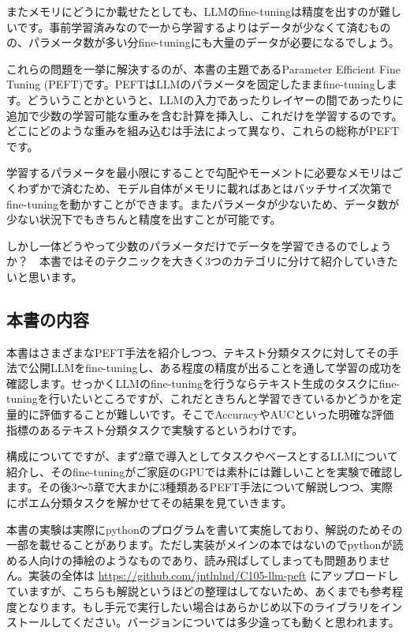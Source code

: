 \documentclass[a5paper,twoside,dvipdfmx]{jsarticle}
\begin{document}
またメモリにどうにか載せたとしても、LLMのfine-tuningは精度を出すのが難しいです。事前学習済みなので一から学習するよりはデータが少なくて済むものの、パラメータ数が多い分fine-tuningにも大量のデータが必要になるでしょう。

これらの問題を一挙に解決するのが、本書の主題であるParameter Efficient Fine Tuning (\textsf{PEFT})です。PEFTはLLMのパラメータを固定したままfine-tuningします。どういうことかというと、LLMの入力であったりレイヤーの間であったりに追加で少数の学習可能な重みを含む計算を挿入し、これだけを学習するのです。どこにどのような重みを組み込むは手法によって異なり、これらの総称がPEFTです。

学習するパラメータを最小限にすることで勾配やモーメントに必要なメモリはごくわずかで済むため、モデル自体がメモリに載ればあとはバッチサイズ次第でfine-tuningを動かすことができます。またパラメータが少ないため、データ数が少ない状況下でもきちんと精度を出すことが可能です。

しかし一体どうやって少数のパラメータだけでデータを学習できるのでしょうか？　本書ではそのテクニックを大きく3つのカテゴリに分けて紹介していきたいと思います。

\subsection{本書の内容}

本書はさまざまなPEFT手法を紹介しつつ、テキスト分類タスクに対してその手法で公開LLMをfine-tuningし、ある程度の精度が出ることを通して学習の成功を確認します。せっかくLLMのfine-tuningを行うならテキスト生成のタスクにfine-tuningを行いたいところですが、これだときちんと学習できているかどうかを定量的に評価することが難しいです。そこでAccuracyやAUCといった明確な評価指標のあるテキスト分類タスクで実験するというわけです。

構成についてですが、まず2章で導入としてタスクやベースとするLLMについて紹介し、そのfine-tuningがご家庭のGPUでは素朴には難しいことを実験で確認します。その後3～5章で大まかに3種類あるPEFT手法について解説しつつ、実際にポエム分類タスクを解かせてその結果を見ていきます。

本書の実験は実際にpythonのプログラムを書いて実施しており、解説のためその一部を載せることがあります。ただし実装がメインの本ではないのでpythonが読める人向けの挿絵のようなものであり、読み飛ばしてしまっても問題ありません。実装の全体は \url{https://github.com/jntlnlnd/C105-llm-peft} にアップロードしていますが、こちらも解説というほどの整理はしてないため、あくまでも参考程度となります。もし手元で実行したい場合はあらかじめ以下のライブラリをインストールしてください。バージョンについては多少違っても動くと思われます。
\end{document}
